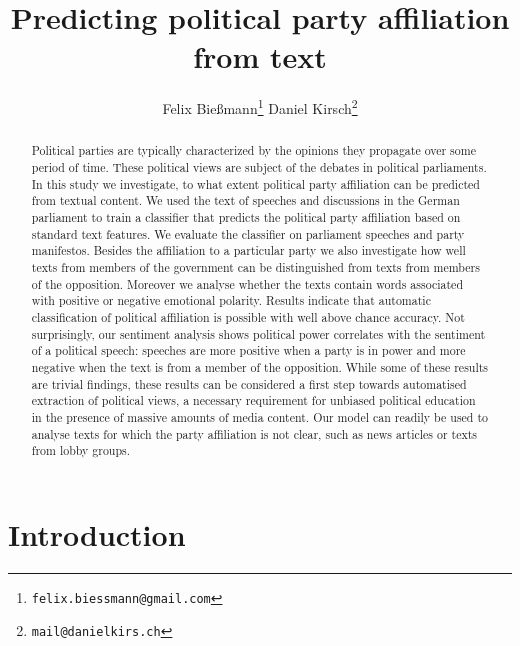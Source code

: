 \documentclass{article} %
\title{Predicting political party affiliation from text}
\author{
Felix Bie\ss{}mann\thanks{\texttt{felix.biessmann@gmail.com}}
\And
Daniel Kirsch\thanks{\texttt{mail@danielkirs.ch}}
}
\begin{document}
\maketitle

\begin{abstract}
Political parties are typically characterized by the opinions they propagate over some period of time. These political views are subject of the debates in political parliaments. In this study we investigate, to what extent political party affiliation can be predicted from textual content. We used the text of speeches and discussions in the German parliament to train a classifier that predicts the political party affiliation based on standard text features. We evaluate the classifier on parliament speeches and party manifestos. Besides the affiliation to a particular party we also investigate how well texts from members of the government can be distinguished from texts from members of the opposition. Moreover we analyse whether the texts contain words associated with positive or negative emotional polarity. Results indicate that automatic classification of political affiliation is possible with well above chance accuracy. Not surprisingly, our sentiment analysis shows political power correlates with the sentiment of a political speech: speeches are more positive when a party is in power and more negative when the text is from a member of the opposition. While some of these results are trivial findings, these results can be considered a first step towards automatised extraction of political views, a necessary requirement for unbiased political education in the presence of massive amounts of media content. Our model can readily be used to analyse texts for which the party affiliation is not clear, such as news articles or texts from lobby groups. 
\end{abstract}

\section{Introduction}

\end{document}
